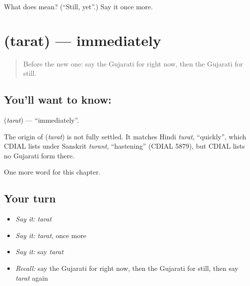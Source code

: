 \begin{tcolorbox}[breakable,colback=teal!4,colframe=teal!35!black,title={Before you move on}]
What does  mean? (\textquotedblleft{}Still, yet\textquotedblright{}.) Say it once more.
\end{tcolorbox}
\section[\texorpdfstring{\gu{તરત} (tarat)}{તરત (tarat)}]{ (tarat) — immediately}

\label{lesson:GU-C95-tarat}



\begin{quote}
Before the new one: say the Gujarati for right now, then the Gujarati for still.
\end{quote}

\subsection*{You'll want to know: }
\textbf{} (\emph{tarat}) — \textquotedblleft{}immediately\textquotedblright{}.

\begin{cousinweb}
The origin of \textbf{} (\emph{tarat}) is not fully settled. It matches Hindi \emph{turat}, \textquotedblleft{}quickly\textquotedblright{}, which CDIAL lists under Sanskrit \emph{turant}, \textquotedblleft{}hastening\textquotedblright{} (CDIAL 5879), but CDIAL lists no Gujarati form there.
\end{cousinweb}

\begin{grammarlens}[title={What you've built}]
One more word for this chapter.
\end{grammarlens}

\subsection*{Your turn}
\begin{itemize}
\raggedright
  \item \emph{Say it:} \emph{tarat}
  \item \emph{Say it:} \emph{tarat}, once more
  \item \emph{Say it:} say \emph{tarat}
  \item \emph{Recall:} say the Gujarati for right now, then the Gujarati for still, then say \emph{tarat} again
\end{itemize}

